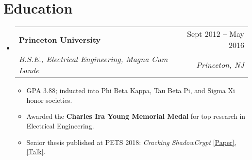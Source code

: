 \documentclass[letterpaper,11pt]{article}
\makeatletter
\newcommand{\resumeItemNoTitle}[1]{
  \item\small{
    {#1 \vspace{-2pt}}
  }
}
\newcommand{\resumeSubheading}[4]{
  \vspace{-1pt}\item
    \begin{tabular*}{0.97\textwidth}{l@{\extracolsep{\fill}}r}
      \textbf{\small#1} & #2 \\
      \textit{#3} & \textit{\small #4} \\
    \end{tabular*}\vspace{-5pt}
}
\newcommand{\resumeSubHeadingListStart}{\begin{itemize}[leftmargin=*]}
\newcommand{\resumeSubHeadingListEnd}{\end{itemize}}
\newcommand{\resumeItemListStart}{\begin{itemize}}
\newcommand{\resumeItemListEnd}{\end{itemize}\vspace{-5pt}}
\makeatother
\begin{document}
\section{Education}
  \resumeSubHeadingListStart
    \resumeSubheading
      {Princeton University}{Sept 2012 -- May 2016}
      {B.S.E., Electrical Engineering, Magna Cum Laude}{Princeton, NJ}
      \resumeItemListStart
        \resumeItemNoTitle{GPA 3.88; inducted into Phi Beta Kappa, Tau Beta Pi, and Sigma Xi honor societies.}
        \resumeItemNoTitle{Awarded the \textbf{Charles Ira Young Memorial Medal} for top research in Electrical Engineering.}
        \resumeItemNoTitle{Senior thesis published at PETS 2018: \textit{Cracking ShadowCrypt} \href{https://petsymposium.org/2018/files/papers/issue2/popets-2018-0012.pdf}{[Paper]}, \href{https://youtu.be/7p0IGo14XcU}{[Talk]}.}
      \resumeItemListEnd
  \resumeSubHeadingListEnd

\end{document}
